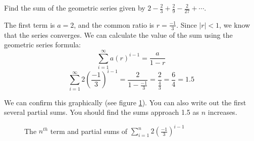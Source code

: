 \begin{Worked}
\begin{Problem}
Find the sum of the geometric series given by $2 - 
\frac{2}{3} + \frac{2}{9} - \frac{2}{27} + \cdots$. 
\end{Problem}
\begin{Solution}
The first term is $a = 2$, and the common 
ratio is $r = \frac{-1}{3}$. Since $|r| < 1$, we know that the series 
converges. We can calculate the value of the sum using the geometric 
series formula: 
$$\sum_{i=1}^\infty a(r)^{i-1} = \frac{a}{1-r}$$
$$\sum_{i=1}^\infty 2(\frac{-1}{3})^{i-1} = \frac{2}{1-\frac{-1}{3}} = 
\frac{2}{\frac{4}{3}} = \frac{6}{4} = 1.5$$

We can confirm this graphically (see figure \ref{fig:geometric}). You 
can also write out the first several partial sums. You should 
find the sums approach 1.5 as $n$ increases.

\begin{figure}[H]
\centering
    \caption{The $n^{th}$ term and partial sums of $\sum_{i=1}^n 
    2(\frac{-1}{3})^{i-1}$}
    \label{fig:geometric}
\end{figure}
\end{Solution}
\end{Worked}

